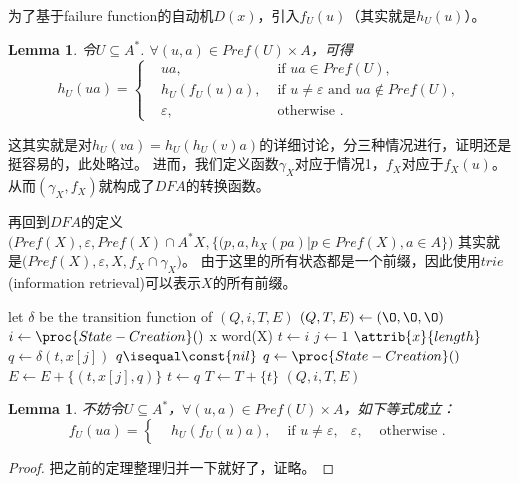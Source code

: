 \documentclass[UTF8]{ctexart}
\newtheorem{lem}[thm]{Lemma}
\theoremstyle{definition}
\theoremstyle{remark}
\numberwithin{equation}{subsection}
\begin{document}
	为了基于failure function的自动机$D(x)$，引入$f_U(u)$（其实就是$h_U(u)$）。
	\begin{lem}
		令$U \subseteq A^*$. $\forall (u,a) \in Pref(U) \times A$，可得
		\[
			h_U(ua) =
			\left\{
				\begin{aligned}
					&ua, &\text{ if } ua \in Pref(U),  \\
					&h_U(f_U(u)a), &\text{ if } u \neq \varepsilon \text{ and } ua \notin Pref(U), \\
					&\varepsilon, &\text{ otherwise }.
				\end{aligned}
			\right .
		\]
	\end{lem}
	这其实就是对$h_U(va) = h_U(h_U(v)a)$的详细讨论，分三种情况进行，证明还是挺容易的，此处略过。
	进而，我们定义函数$\gamma_X$对应于情况1，$f_X$对应于$f_X(u)$。从而$(\gamma_X, f_X)$就构成了$DFA$的转换函数。
	
	再回到$DFA$的定义$\Big( Pref(X), \varepsilon, Pref(X) \cap A^*X, \{(p,a,h_X(pa) | p \in Pref(X), a \in A\} \Big)$
	其实就是$\Big( Pref(X), \varepsilon, X, f_X \cap \gamma_X \Big)$。
	由于这里的所有状态都是一个前缀，因此使用$trie$(information retrieval)可以表示$X$的所有前缀。
	
    \begin{codebox}
    \zi \Comment let $\delta$ be the transition function of $(Q, i, T, E)$
    \li $(Q, T, E) \gets ({\O}, {\O}, {\O})$
    \li $i \gets \proc{State-Creation}()$
    \li	\For x  word(X)
    \li     \Do
                $t \gets i$
    \li         \For $j \gets 1$ \To $\attrib{x}{length}$
    \li             \Do
                        $q \gets \delta(t, x[j])$
    \li                 \If $q \isequal \const{nil}$
    \li                     \Then
                                $q \gets \proc{State-Creation}()$
    \li                         $E \gets E + \{(t, x[j], q)\}$
                            \End
    \li                 $t \gets q$
                    \End
    \li         $T \gets T + \{t\}$
            \End
    \li \Return $(Q, i, T, E)$
    \end{codebox}
	
	\begin{lem}
		不妨令$U \subseteq A^*$，$\forall (u,a) \in Pref(U) \times A$，如下等式成立：
		\[
			f_U(ua) =
			\left\{
				\begin{aligned}
					&h_U(f_U(u)a), &\text{ if } u \neq \varepsilon,
					&\varepsilon, &\text{ otherwise }.
				\end{aligned}
			\right .
		\]
	\end{lem}
	\begin{proof}
		把之前的定理整理归并一下就好了，证略。
	\end{proof}
	
\end{document}
